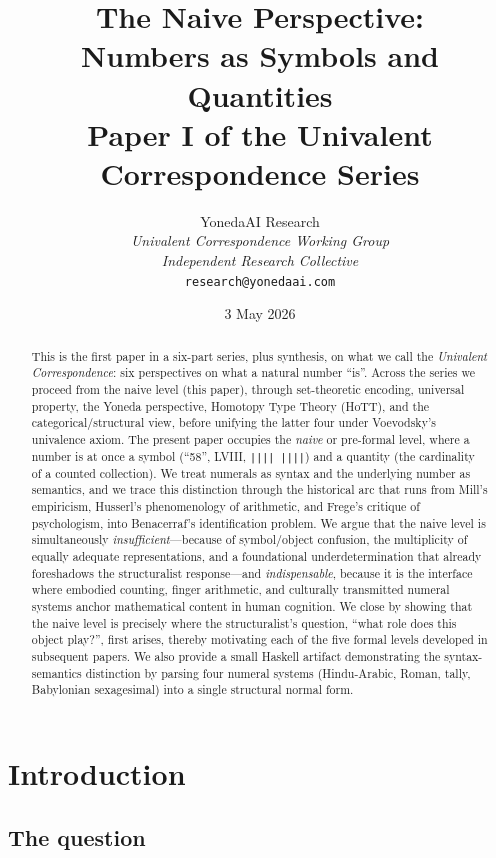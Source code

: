 \documentclass[12pt]{article}
\title{The Naive Perspective: \\ Numbers as Symbols and Quantities \\
\large Paper I of the Univalent Correspondence Series}
\author{YonedaAI Research \\
\textit{Univalent Correspondence Working Group} \\
\textit{Independent Research Collective} \\
\texttt{research@yonedaai.com}}
\date{3 May 2026}
\theoremstyle{definition}
\theoremstyle{remark}
\begin{document}
\maketitle

\begin{abstract}
This is the first paper in a six-part series, plus synthesis, on what we call
the \emph{Univalent Correspondence}: six perspectives on what a natural number
``is''. Across the series we proceed from the naive level (this paper),
through set-theoretic encoding, universal property, the Yoneda perspective,
Homotopy Type Theory (HoTT), and the categorical/structural view, before
unifying the latter four under Voevodsky's univalence axiom. The present
paper occupies the \emph{naive} or pre-formal level, where a number is at
once a symbol (``58'', \textsf{LVIII}, \texttt{||||\,||||}) and a quantity
(the cardinality of a counted collection). We treat numerals as syntax and
the underlying number as semantics, and we trace this distinction through
the historical arc that runs from Mill's empiricism, Husserl's phenomenology
of arithmetic, and Frege's critique of psychologism, into Benacerraf's
identification problem. We argue that the naive level is simultaneously
\emph{insufficient}---because of symbol/object confusion, the multiplicity
of equally adequate representations, and a foundational underdetermination
that already foreshadows the structuralist response---and \emph{indispensable},
because it is the interface where embodied counting, finger arithmetic,
and culturally transmitted numeral systems anchor mathematical content in
human cognition. We close by showing that the naive level is precisely
where the structuralist's question, ``what role does this object play?'',
first arises, thereby motivating each of the five formal levels developed
in subsequent papers. We also provide a small Haskell artifact demonstrating
the syntax-semantics distinction by parsing four numeral systems (Hindu-Arabic,
Roman, tally, Babylonian sexagesimal) into a single structural normal form.
\end{abstract}

\tableofcontents
\bigskip

\section{Introduction}
\label{sec:introduction}

\subsection{The question}
\end{document}
